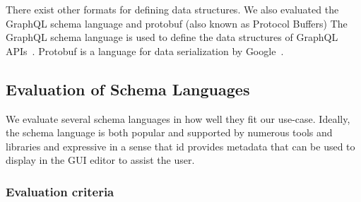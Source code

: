 \documentclass[lettersize,journal]{IEEEtran}
\begin{document}
There exist other formats for defining data structures. We also evaluated the GraphQL schema language and protobuf (also known as Protocol Buffers)
The GraphQL schema language is used to define the data structures of GraphQL APIs~\cite{graphQL}. Protobuf is a language for data serialization by Google~\cite{protobufProtocolBuffers}.

\subsection{Evaluation of Schema Languages}



We evaluate several schema languages in how well they fit our use-case. Ideally, the schema language is both popular and supported by numerous tools and libraries and expressive in a sense that id provides metadata that can be used to display in the GUI editor to assist the user. 

\subsubsection{Evaluation criteria} %
\end{document}
